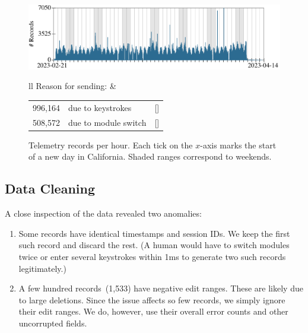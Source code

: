 \documentclass[english,submission,cleveref]{programming}
\begin{document}
\begin{figure}[t]\centering
  \includegraphics[width=\columnwidth]{img/row-distribution.pdf}
  \begin{tabular}{ll}
    Reason for sending:
    &
    \begin{tabular}[t]{r@{~~}l@{~~}r}
      996,164 & due to keystrokes  & [\pct{66.20}] \\
      508,572 & due to module switch & [\pct{33.80}]
    \end{tabular}
  \end{tabular}
  \caption{Telemetry records per hour. Each tick on the $x$-axis marks the start of a new day in California. Shaded ranges correspond to weekends.}
  \label{f:records-per-hour}
\end{figure}


\subsection{Data Cleaning}
\label{s:data-cleaning}

A close inspection of the data revealed two anomalies:
\begin{enumerate}
  \item
    Some records have identical timestamps and session IDs.
    We keep the first such record and discard the rest.
    (A human would have to switch modules twice or enter several keystrokes
     within 1ms to generate two such records legitimately.)

   \item
     A few hundred records~(1,533) have negative edit ranges.
     These are likely due to large deletions.
     Since the issue affects so few records, we simply ignore
     their edit ranges. We do, however, use their overall error counts and other uncorrupted fields.

\end{enumerate}
\end{document}
